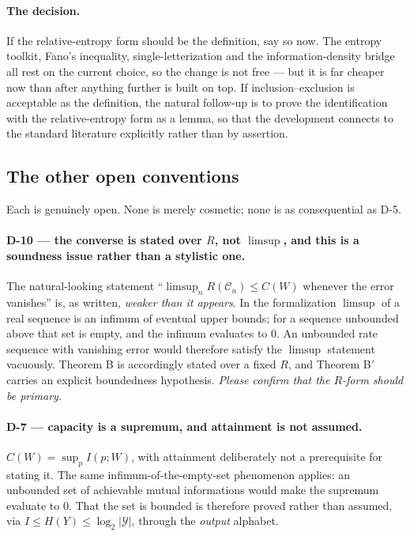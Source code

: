 \documentclass[11pt,a4paper]{article}
\newcommand{\Y}{\mathcal{Y}}
\newcommand{\code}{\mathcal{C}}
\begin{document}
\paragraph{The decision.}
If the relative-entropy form should be the definition, say so now. The entropy
toolkit, Fano's inequality, single-letterization and the information-density
bridge all rest on the current choice, so the change is not free --- but it is far
cheaper now than after anything further is built on top. If inclusion--exclusion
is acceptable as the definition, the natural follow-up is to prove the
identification with the relative-entropy form as a lemma, so that the development
connects to the standard literature explicitly rather than by assertion.

\subsection{The other open conventions}

Each is genuinely open. None is merely cosmetic; none is as consequential as
D-5.

\paragraph{D-10 --- the converse is stated over $R$, not $\limsup$, and this is a
soundness issue rather than a stylistic one.}
The natural-looking statement ``$\limsup_n R(\code_n)\le C(W)$ whenever the error
vanishes'' is, as written, \emph{weaker than it appears}. In the formalization
$\limsup$ of a real sequence is an infimum of eventual upper bounds; for a
sequence unbounded above that set is empty, and the infimum evaluates to $0$. An
unbounded rate sequence with vanishing error would therefore satisfy the
$\limsup$ statement vacuously. Theorem B is accordingly stated over a fixed $R$,
and Theorem B$'$ carries an explicit boundedness hypothesis. \emph{Please confirm
that the $R$-form should be primary.}

\paragraph{D-7 --- capacity is a supremum, and attainment is not assumed.}
$C(W)=\sup_p I(p;W)$, with attainment deliberately not a prerequisite for stating
it. The same infimum-of-the-empty-set phenomenon applies: an unbounded set of
achievable mutual informations would make the supremum evaluate to $0$. That the
set is bounded is therefore proved rather than assumed, via
$I \le H(Y) \le \log_2|\Y|$, through the \emph{output} alphabet.
\end{document}
